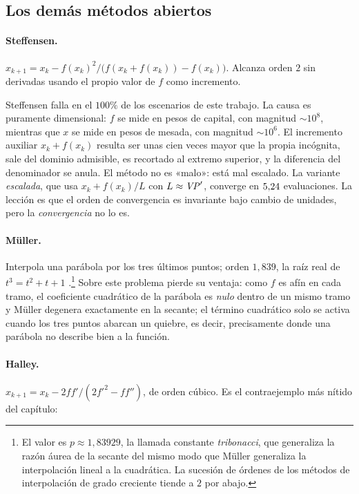 \subsection{Los demás métodos abiertos}

\paragraph{Steffensen.}
$x_{k+1}=x_k-f(x_k)^2/\bigl(f(x_k+f(x_k))-f(x_k)\bigr)$. Alcanza orden $2$ sin
derivadas usando el propio valor de $f$ como incremento.

\begin{criticism}
\label{crit:steffensen}
Steffensen falla en el $100\%$ de los escenarios de este trabajo. La causa es
puramente dimensional: $f$ se mide en pesos de capital, con magnitud
$\sim10^8$, mientras que $x$ se mide en pesos de mesada, con magnitud
$\sim10^6$. El incremento auxiliar $x_k+f(x_k)$ resulta ser unas cien veces mayor
que la propia incógnita, sale del dominio admisible, es recortado al extremo
superior, y la diferencia del denominador se anula. El método no es «malo»: está
mal escalado. La variante \emph{escalada}, que usa $x_k+f(x_k)/L$ con
$L\approx\mathit{VP}'$, converge en $5{,}24$ evaluaciones. La lección es que el orden
de convergencia es invariante bajo cambio de unidades, pero la \emph{convergencia}
no lo es.
\end{criticism}

\paragraph{Müller.}
Interpola una parábola por los tres últimos puntos; orden $1{,}839$, la raíz real
de $t^3=t^2+t+1$ \citep{muller1956}.\footnote{El valor es $p\approx1{,}83929$, la llamada constante \emph{tribonacci}, que generaliza la razón áurea de la secante del mismo modo que Müller generaliza la interpolación lineal a la cuadrática. La sucesión de órdenes de los métodos de interpolación de grado creciente tiende a $2$ por abajo.} Sobre este problema pierde su ventaja: como
$f$ es afín en cada tramo, el coeficiente cuadrático de la parábola es
\emph{nulo} dentro de un mismo tramo y Müller degenera exactamente en la secante;
el término cuadrático solo se activa cuando los tres puntos abarcan un quiebre, es
decir, precisamente donde una parábola no describe bien a la función.

\paragraph{Halley.}
$x_{k+1}=x_k-2ff'/(2f'^2-ff'')$, de orden cúbico. Es el contraejemplo más nítido
del capítulo:

